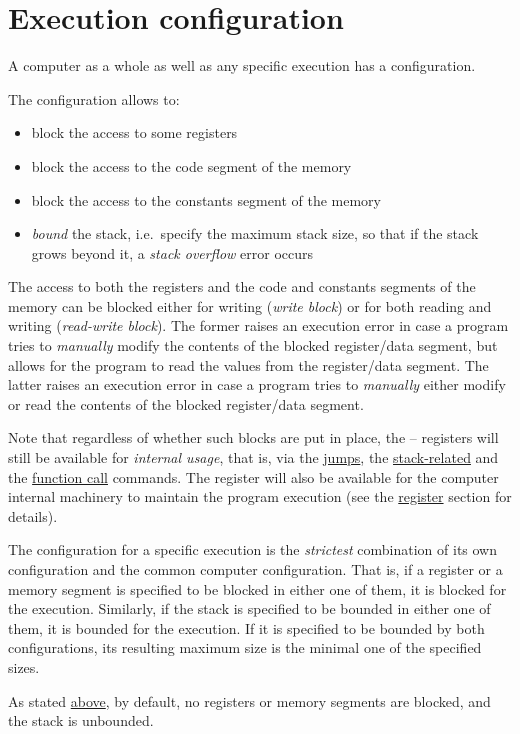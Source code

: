 \hypertarget{config}{
	\section{Execution configuration}
}

A  computer as a whole as well as any specific execution
has a configuration.

The configuration allows to:

\begin{itemize}
	\item block the access to some registers
	\item block the access to the code segment of the memory
	\item block the access to the constants segment of the memory
	\item \textit{bound} the stack, i.e.\ specify the maximum stack size,
	so that if the stack grows beyond it, a \textit{stack overflow} error occurs
\end{itemize}

The access to both the registers and the code and constants segments of
the memory can be blocked either for writing (\textit{write block}) or for both
reading and writing (\textit{read-write block}).
The former raises an execution error in case a program tries to
\textit{manually} modify the contents of the blocked register/data segment,
but allows for the program to read the values from the register/data segment.
The latter raises an execution error in case a program tries to
\textit{manually} either modify or read the contents of the blocked
register/data segment.

Note that regardless of whether such blocks are put in place,
the -- registers will still be available for
\textit{internal usage}, that is, via the \hyperlink{cmd:flags}{jumps},
the \hyperlink{cmd:stack}{stack-related} and
the \hyperlink{functions:commands}{function call} commands.
The  register will also be available for the  computer
internal machinery to maintain the program execution
(see the \hyperlink{r15}{ register} section for details).

The configuration for a specific execution is the \textit{strictest} combination
of its own configuration and the common  computer configuration.
That is, if a register or a memory segment is specified to be blocked in either
one of them, it is blocked for the execution.
Similarly, if the stack is specified to be bounded in either one of them,
it is bounded for the execution.
If it is specified to be bounded by both configurations,
its resulting maximum size is the minimal one of the specified sizes.

As stated \hyperlink{standard:notes}{above}, by default, no registers or
memory segments are blocked, and the stack is unbounded.